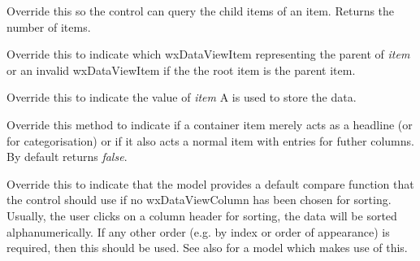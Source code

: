 \label{wxdataviewmodelgetchildren}


Override this so the control can query the child items of
an item. Returns the number of items.


\label{wxdataviewmodelgetparent}


Override this to indicate which wxDataViewItem representing the parent
of {\it item} or an invalid wxDataViewItem if the the root item is
the parent item.


\label{wxdataviewmodelgetvalue}


Override this to indicate the value of {\it item}
A  is used to store the data.



\label{wxdataviewmodelhascontainercolumns}


Override this method to indicate if a container item merely
acts as a headline (or for categorisation) or if it also
acts a normal item with entries for futher columns. By 
default returns {\it false}.


\label{wxdataviewmodelhasdefaultcompare}


Override this to indicate that the model provides a default compare
function that the control should use if no wxDataViewColumn has been
chosen for sorting. Usually, the user clicks on a column header for
sorting, the data will be sorted alphanumerically. If any other
order (e.g. by index or order of appearance) is required, then this
should be used. See also 
for a model which makes use of this.


\label{wxdataviewmodeliscontainer}

